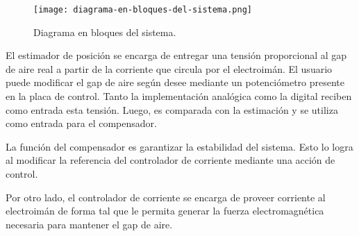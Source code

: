\begin{figure}[H]
	\centering
	\texttt{[image: diagrama-en-bloques-del-sistema.png]}
	\caption{Diagrama en bloques del sistema.}
	\label{fig:img_diagrama-en-bloques-del-sistema}
\end{figure}

\noindent El estimador de posición se encarga de entregar una tensión proporcional al gap de aire real a partir de la corriente que circula por el electroimán. El usuario puede modificar el gap de aire según desee mediante un potenciómetro presente en la placa de control. Tanto la implementación analógica como la digital reciben como entrada esta tensión. Luego, es comparada con la estimación y se utiliza como entrada para el compensador.

\noindent La función del compensador es garantizar la estabilidad del sistema. Esto lo logra al modificar la referencia del controlador de corriente mediante una acción de control. 

\noindent Por otro lado, el controlador de corriente se encarga de proveer corriente al electroimán de forma tal que le permita generar la fuerza electromagnética necesaria para mantener el gap de aire.
 